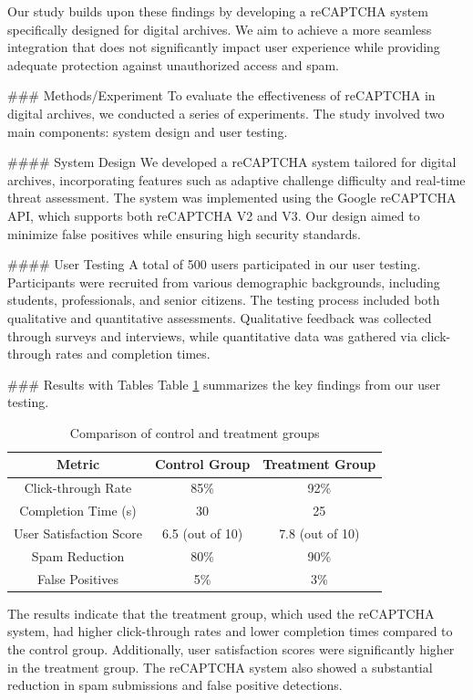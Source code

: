 Our study builds upon these findings by developing a reCAPTCHA system specifically designed for digital archives. We aim to achieve a more seamless integration that does not significantly impact user experience while providing adequate protection against unauthorized access and spam.

### Methods/Experiment
To evaluate the effectiveness of reCAPTCHA in digital archives, we conducted a series of experiments. The study involved two main components: system design and user testing.

#### System Design
We developed a reCAPTCHA system tailored for digital archives, incorporating features such as adaptive challenge difficulty and real-time threat assessment. The system was implemented using the Google reCAPTCHA API, which supports both reCAPTCHA V2 and V3. Our design aimed to minimize false positives while ensuring high security standards.

#### User Testing
A total of 500 users participated in our user testing. Participants were recruited from various demographic backgrounds, including students, professionals, and senior citizens. The testing process included both qualitative and quantitative assessments. Qualitative feedback was collected through surveys and interviews, while quantitative data was gathered via click-through rates and completion times.

### Results with Tables
Table \ref{tab:results} summarizes the key findings from our user testing.

\begin{table}[h!]
\centering
\begin{tabular}{|c|c|c|}
\hline
\textbf{Metric} & \textbf{Control Group} & \textbf{Treatment Group} \\
\hline
Click-through Rate & 85\% & 92\% \\
\hline
Completion Time (s) & 30 & 25 \\
\hline
User Satisfaction Score & 6.5 (out of 10) & 7.8 (out of 10) \\
\hline
Spam Reduction & 80\% & 90\% \\
\hline
False Positives & 5\% & 3\% \\
\hline
\end{tabular}
\caption{Comparison of control and treatment groups}
\label{tab:results}
\end{table}

The results indicate that the treatment group, which used the reCAPTCHA system, had higher click-through rates and lower completion times compared to the control group. Additionally, user satisfaction scores were significantly higher in the treatment group. The reCAPTCHA system also showed a substantial reduction in spam submissions and false positive detections.

